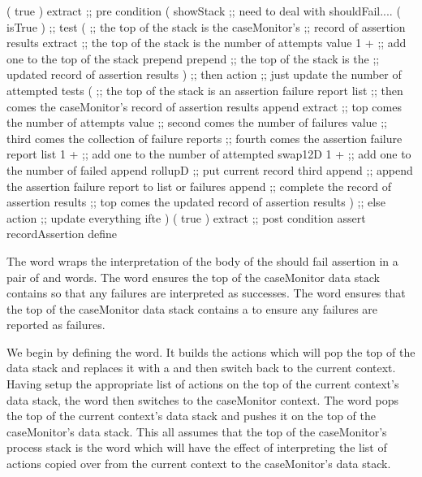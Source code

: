 \startJoylolCode
( { true } ) extract ;; pre condition
(
  showStack ;; need to deal with shouldFail....
  (
    isTrue
  )  ;; test
  (
    ;; the top of the stack is the caseMonitor's
    ;; record of assertion results
    extract
    ;; the top of the stack is the number of attempts value
    1 + ;; add one to the top of the stack
    prepend
    prepend
    ;; the top of the stack is the
    ;; updated record of assertion results
  )  ;; then action ;; just update the number of attempted tests 
  (
    ;; the top of the stack is an assertion failure report list
    ;; then comes the caseMonitor's record of assertion results
    append
    extract
    ;; top    comes the number of attempts value
    ;; second comes the number of failures value
    ;; third  comes the collection of failure reports
    ;; fourth comes the assertion failure report list
    1 + ;; add one to the number of attempted
    swap12D
    1 + ;; add one to the number of failed
    append
    rollupD ;; put current record third
    append  ;; append the assertion failure report to list or failures
    append  ;; complete the record of assertion results
    ;; top comes the updated record of assertion results
  )  ;; else action ;; update everything
  ifte
)
( { true } ) extract ;; post condition
assert
recordAssertion
define
\stopJoylolCode
\stopTestSuite

\startTestSuite[assertShouldFail]

The  word wraps the interpretation of the body of 
the should fail assertion in a pair of  and 
 words. The  word ensures 
the top of the caseMonitor data stack contains  so that any 
failures are interpreted as successes. The  word 
ensures that the top of the caseMonitor data stack contains a  
to ensure any failures are reported as failures. 

We begin by defining the  word. It builds the 
actions which will pop the top of the data stack and replaces it with a 
 and then switch back to the current context. Having setup the 
appropriate list of actions on the top of the current context's data 
stack, the  word then switches to the caseMonitor 
context. The  word pops the top of the current context's 
data stack and pushes it on the top of the caseMonitor's data stack. This 
all assumes that the top of the caseMonitor's process stack is the 
 word which will have the effect of interpreting the list 
of actions copied over from the current context to the caseMonitor's data 
stack. 

